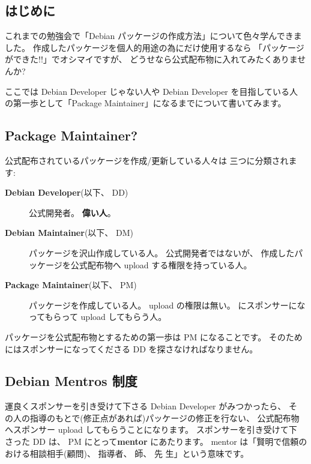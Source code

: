 \documentclass[mingoth,a4paper]{jsarticle}
\begin{document}

\subsection{はじめに}

これまでの勉強会で「Debian パッケージの作成方法」について色々学んできました。
作成したパッケージを個人的用途の為にだけ使用するなら
「パッケージができた!!」でオシマイですが、 
どうせなら公式配布物に入れてみたくありませんか?

ここでは Debian Developer じゃない人や Debian Developer を目指している人
の第一歩として「Package Maintainer」になるまでについて書いてみます。

\subsection{Package Maintainer?}

公式配布されているパッケージを作成/更新している人々は
三つに分類されます:

\begin{description}
      \item[{\bf Debian Developer}(以下、 DD)] 公式開発者。 {\bf 偉い人}。
      \item[{\bf Debian Maintainer}(以下、 DM)] パッケージを沢山作成している人。
    公式開発者ではないが、 
    作成したパッケージを公式配布物へ upload する権限を持っている人。
      \item[{\bf Package Maintainer}(以下、 PM)] パッケージを作成している人。
    upload の権限は無い。 
    にスポンサーになってもらって upload してもらう人。
\end{description}

パッケージを公式配布物とするための第一歩は PM になることです。
そのためにはスポンサーになってくださる DD を探さなければなりません。

\subsection{Debian Mentros 制度}

運良くスポンサーを引き受けて下さる Debian Developer がみつかったら、 そ
の人の指導のもとで(修正点があれば)パッケージの修正を行ない、 公式配布物
へスポンサー upload してもらうことになります。  スポンサーを引き受けて下
さった DD は、 PM にとって{\bf mentor} にあたります。 
mentor は「賢明で信頼のおける相談相手(顧問)、 指導者、 師、 先
生」という意味です。
\end{document}
